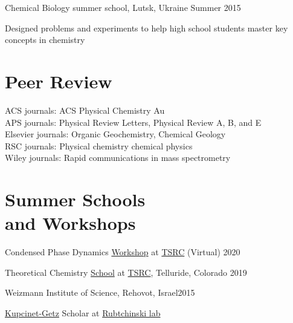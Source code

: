 \documentclass[margin,line]{res}
\newenvironment{list1}{
  \begin{list}{\ding{113}}{%
      \setlength{\itemsep}{0in}
      \setlength{\parsep}{0in} \setlength{\parskip}{0in}
      \setlength{\topsep}{0in} \setlength{\partopsep}{0in} 
      \setlength{\leftmargin}{0.17in}}}{\end{list}}
\begin{document}
\begin{resume}
\vspace{-0.3cm}

Chemical Biology summer school, Lutsk, Ukraine \hfill{Summer 2015}

\begin{list1}
\item[]
Designed problems and experiments to help high school students master key concepts in chemistry
\end{list1}

\section{\sc Peer Review}
ACS journals: ACS Physical Chemistry Au\\
APS journals: Physical Review Letters, Physical Review A, B, and E\\
Elsevier journals: Organic Geochemistry, Chemical Geology\\ 
RSC journals: Physical chemistry chemical physics\\
Wiley journals: Rapid communications in mass spectrometry

\section{\sc Summer Schools\\and Workshops}
%
%
Condensed Phase Dynamics  \href{https://meetings.telluridescience.org/meetings/workshop-details?wid=829}{Workshop} at \href{https://www.telluridescience.org/schools/tellurideschoolontheoreticalchemistry}{TSRC} (Virtual) \hfill {2020}

\vspace*{-2mm}

Theoretical Chemistry \href{https://meetings.telluridescience.org/meetings/workshop-details?wid=775}{School} at \href{https://www.telluridescience.org/schools/tellurideschoolontheoreticalchemistry}{TSRC}, Telluride, Colorado \hfill {2019}

\vspace*{-2mm}

Weizmann Institute of Science, Rehovot, Israel\hfill{2015}\\
\vspace*{-.1in}
\begin{list1}
\item[] \href{https://www.weizmann.ac.il/feinberg/admissions/kupcinet-getz-international-summer-school/about-program-0}{Kupcinet-Getz} Scholar at \href{https://www.weizmann.ac.il/Organic_Chemistry/Rybtchinski/}{Rubtchinski lab}
\end{list1}


\end{resume}
\end{document}
